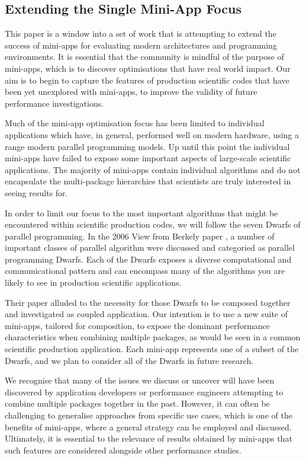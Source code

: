\documentclass[runningheads,a4paper]{llncs}
\begin{document}
\subsection{Extending the Single Mini-App Focus}

This paper is a window into a set of work that is attempting to extend the success of mini-apps for evaluating modern architectures and programming environments. It is essential that the community is mindful of the purpose of mini-apps, which is to discover optimisations that have real world impact. Our aim is to begin to capture the features of production scientific codes that have been yet unexplored with mini-apps, to improve the validity of future performance investigations. 

Much of the mini-app optimisation focus has been limited to individual applications which have, in general, performed well on modern hardware, using a range modern parallel programming models. Up until this point the individual mini-apps have failed to expose some important aspects of large-scale scientific applications. The majority of mini-apps contain individual algorithms and do not encapsulate the multi-package hierarchies that scientists are truly interested in seeing results for.

In order to limit our focus to the most important algorithms that might be encountered within scientific production codes, we will follow the seven Dwarfs of parallel programming. In the 2006 View from Berkely paper \cite{Asanovic2006}, a number of important classes of parallel algorithm were discussed and categoried as parallel programming Dwarfs. Each of the Dwarfs exposes a diverse computational and communicational pattern and can encompass many of the algorithms you are likely to see in production scientific applications.  

Their paper alluded to the necessity for those Dwarfs to be composed together and investigated as coupled application. Our intention is to use a new suite of mini-apps, tailored for composition, to expose the dominant performance characteristics when combining multiple packages, as would be seen in a common scientific production application. Each mini-app represents one of a subset of the Dwarfs, and we plan to consider all of the Dwarfs in future research.

We recognise that many of the issues we discuss or uncover will have been discovered by application developers or performance engineers attempting to combine multiple packages together in the past. However, it can often be challenging to generalise approaches from specific use cases, which is one of the benefits of mini-apps, where a general strategy can be employed and discussed. Ultimately, it is essential to the relevance of results obtained by mini-apps that such features are considered alongside other performance studies. 
\end{document}
